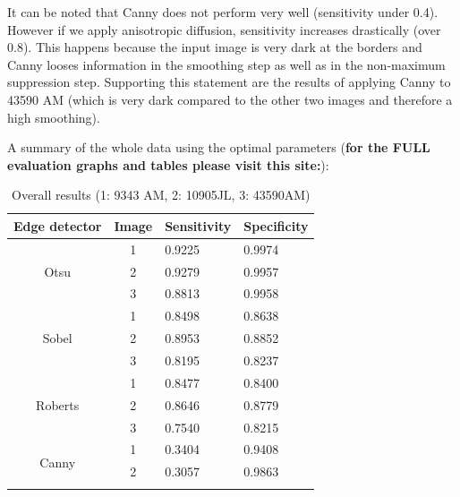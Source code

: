\documentclass{article}
\begin{document}
	It can be noted that Canny does not perform very well (sensitivity under 0.4).
	However if we apply anisotropic diffusion,
	sensitivity increases drastically (over 0.8). This happens because the input image
	is very dark at the borders and Canny looses information in the smoothing
	step as well as in the non-maximum suppression step. Supporting this statement
	are the results of applying Canny to 43590 AM (which is very dark compared to
	the other two images and therefore a high smoothing).
	
	A summary of the whole data using the optimal parameters (\textbf{for the FULL evaluation graphs and tables please visit this site:}):
	
\begin{table}[H]
\centering
\caption{Overall results (1: 9343 AM, 2: 10905JL, 3: 43590AM)}
\label{my-label}
\begin{tabular}{|c|c|l|l|}
\hline
\multicolumn{1}{|l|}{Edge detector} & \multicolumn{1}{l|}{Image} & Sensitivity & Specificity \\ \hline
\multirow{3}{*}{Otsu}               & 1                          & 0.9225      & 0.9974      \\ \cline{2-4} 
                                    & 2                          & 0.9279      & 0.9957      \\ \cline{2-4} 
                                    & 3                          & 0.8813      & 0.9958      \\ \hline
\multirow{3}{*}{Sobel}              & 1                          & 0.8498      & 0.8638      \\ \cline{2-4} 
                                    & 2                          & 0.8953      & 0.8852      \\ \cline{2-4} 
                                    & 3                          & 0.8195      & 0.8237      \\ \hline
\multirow{3}{*}{Roberts}            & 1                          & 0.8477      & 0.8400      \\ \cline{2-4} 
                                    & 2                          & 0.8646      & 0.8779      \\ \cline{2-4} 
                                    & 3                          & 0.7540      & 0.8215      \\ \hline
\multirow{3}{*}{Canny}              & 1                          & 0.3404      & 0.9408      \\ \cline{2-4} 
                                    & 2                          & 0.3057      & 0.9863      \\ \cline{2-4} 

\end{tabular}
\end{table}
\end{document}
